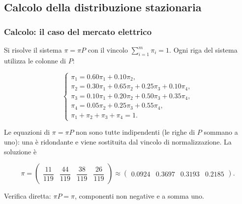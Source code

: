 

\subsection{Calcolo della distribuzione stazionaria}%

\begin{frame}%
%

\frametitle{Calcolo: il caso del mercato elettrico}%
%

%


Si risolve il sistema $\pi=\pi P$ con il vincolo $\sum_{i=1}^{m}\pi_{i}=1$.
Ogni riga del sistema utilizza le colonne di $P:$%

\[%
\begin{cases}
\pi_{1} = 0.60\pi_{1}+0.10\pi_{2},\\
\pi_{2} = 0.30\pi_{1}+0.65\pi_{2}+0.25\pi_{3}+0.10\pi_{4},\\
\pi_{3} = 0.10\pi_{1}+0.20\pi_{2}+0.50\pi_{3}+0.35\pi_{4},\\
\pi_{4} = 0.05\pi_{2}+0.25\pi_{3}+0.55\pi_{4},\\
\pi_{1}+\pi_{2}+\pi_{3}+\pi_{4}=1.
\end{cases}
\]


Le equazioni di $\pi=\pi P$ non sono tutte indipendenti (le righe di $P$
sommano a uno): una \`{e} ridondante e viene sostituita dal vincolo di
normalizzazione. La soluzione \`{e}%

\[
\pi=
\begin{pmatrix}
\dfrac{11}{119} & \dfrac{44}{119} & \dfrac{38}{119} & \dfrac{26}{119}%
\end{pmatrix}
\approx%
\begin{pmatrix}
0.0924 & 0.3697 & 0.3193 & 0.2185
\end{pmatrix}
.
\]


\medskip

\begin{center}
{\small Verifica diretta: $\pi P=\pi$, componenti non negative e a somma uno.}
\end{center}

%

\transboxout
\end{frame}%


